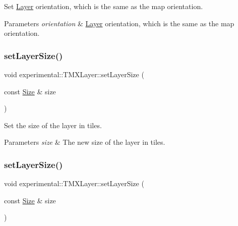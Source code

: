 Set \hyperlink{classLayer}{Layer} orientation, which is the same as the map orientation.


\begin{DoxyParams}{Parameters}
{\em orientation} & \hyperlink{classLayer}{Layer} orientation, which is the same as the map orientation. \\
\hline
\end{DoxyParams}
\mbox{\label{classexperimental_1_1TMXLayer_a2448a36973d1f58f47136d5b6040f008}} 
\subsubsection{\texorpdfstring{set\+Layer\+Size()}{setLayerSize()}\hspace{0.1cm}{\footnotesize\ttfamily [1/2]}}
{\footnotesize\ttfamily void experimental\+::\+T\+M\+X\+Layer\+::set\+Layer\+Size (\begin{DoxyParamCaption}\item[{const \hyperlink{classSize}{Size} \&}]{size }\end{DoxyParamCaption})\hspace{0.3cm}{\ttfamily [inline]}}

Set the size of the layer in tiles.


\begin{DoxyParams}{Parameters}
{\em size} & The new size of the layer in tiles. \\
\hline
\end{DoxyParams}
\mbox{\label{classexperimental_1_1TMXLayer_a2448a36973d1f58f47136d5b6040f008}} 
\subsubsection{\texorpdfstring{set\+Layer\+Size()}{setLayerSize()}\hspace{0.1cm}{\footnotesize\ttfamily [2/2]}}
{\footnotesize\ttfamily void experimental\+::\+T\+M\+X\+Layer\+::set\+Layer\+Size (\begin{DoxyParamCaption}\item[{const \hyperlink{classSize}{Size} \&}]{size }\end{DoxyParamCaption})\hspace{0.3cm}{\ttfamily [inline]}}

